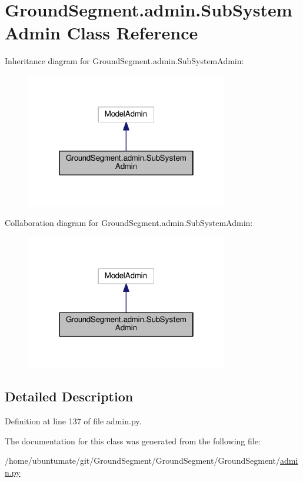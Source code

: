 \hypertarget{class_ground_segment_1_1admin_1_1_sub_system_admin}{}\section{Ground\+Segment.\+admin.\+Sub\+System\+Admin Class Reference}
\label{class_ground_segment_1_1admin_1_1_sub_system_admin}


Inheritance diagram for Ground\+Segment.\+admin.\+Sub\+System\+Admin\+:\nopagebreak
\begin{figure}[H]
\begin{center}
\leavevmode
\includegraphics[width=250pt]{class_ground_segment_1_1admin_1_1_sub_system_admin__inherit__graph}
\end{center}
\end{figure}


Collaboration diagram for Ground\+Segment.\+admin.\+Sub\+System\+Admin\+:\nopagebreak
\begin{figure}[H]
\begin{center}
\leavevmode
\includegraphics[width=250pt]{class_ground_segment_1_1admin_1_1_sub_system_admin__coll__graph}
\end{center}
\end{figure}


\subsection{Detailed Description}


Definition at line 137 of file admin.\+py.



The documentation for this class was generated from the following file\+:\begin{DoxyCompactItemize}
\item 
/home/ubuntumate/git/\+Ground\+Segment/\+Ground\+Segment/\+Ground\+Segment/\hyperlink{admin_8py}{admin.\+py}\end{DoxyCompactItemize}
